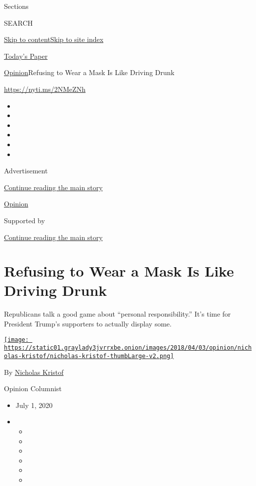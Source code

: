 Sections

SEARCH

\protect\hyperlink{site-content}{Skip to
content}\protect\hyperlink{site-index}{Skip to site index}

\href{https://myaccount.nytimes3xbfgragh.onion/auth/login?response_type=cookie\&client_id=vi}{}

\href{https://www.nytimes3xbfgragh.onion/section/todayspaper}{Today's
Paper}

\href{/section/opinion}{Opinion}\textbar{}Refusing to Wear a Mask Is
Like Driving Drunk

\url{https://nyti.ms/2NMeZNh}

\begin{itemize}
\item
\item
\item
\item
\item
\item
\end{itemize}

Advertisement

\protect\hyperlink{after-top}{Continue reading the main story}

\href{/section/opinion}{Opinion}

Supported by

\protect\hyperlink{after-sponsor}{Continue reading the main story}

\hypertarget{refusing-to-wear-a-mask-is-like-driving-drunk}{%
\section{Refusing to Wear a Mask Is Like Driving
Drunk}\label{refusing-to-wear-a-mask-is-like-driving-drunk}}

Republicans talk a good game about ``personal responsibility.'' It's
time for President Trump's supporters to actually display some.

\href{https://www.nytimes3xbfgragh.onion/column/nicholas-kristof}{\texttt{[image: https://static01.graylady3jvrrxbe.onion/images/2018/04/03/opinion/nicholas-kristof/nicholas-kristof-thumbLarge-v2.png]}}

By
\href{https://www.nytimes3xbfgragh.onion/column/nicholas-kristof}{Nicholas
Kristof}

Opinion Columnist

\begin{itemize}
\item
  July 1, 2020
\item
  \begin{itemize}
  \item
  \item
  \item
  \item
  \item
  \item
  \end{itemize}
\end{itemize}

